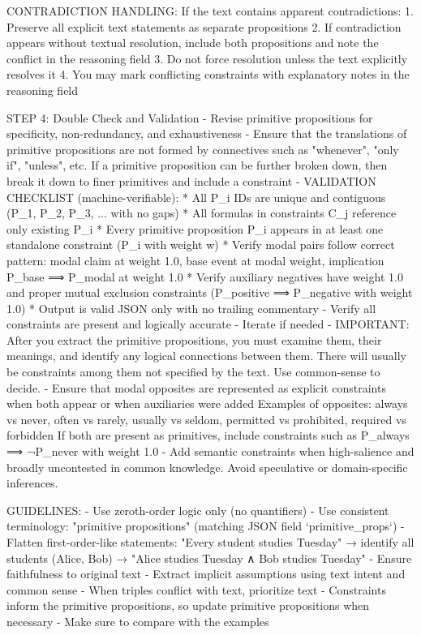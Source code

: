 CONTRADICTION HANDLING:
If the text contains apparent contradictions:
1. Preserve all explicit text statements as separate propositions
2. If contradiction appears without textual resolution, include both propositions and note the conflict in the reasoning field
3. Do not force resolution unless the text explicitly resolves it
4. You may mark conflicting constraints with explanatory notes in the reasoning field

STEP 4: Double Check and Validation
- Revise primitive propositions for specificity, non-redundancy, and exhaustiveness
- Ensure that the translations of primitive propositions are not formed by connectives such as "whenever", "only if", "unless", etc. If a primitive proposition can be further broken down, then break it down to finer primitives and include a constraint
- VALIDATION CHECKLIST (machine-verifiable):
  * All P_i IDs are unique and contiguous (P_1, P_2, P_3, ... with no gaps)
  * All formulas in constraints C_j reference only existing P_i
  * Every primitive proposition P_i appears in at least one standalone constraint (P_i with weight w)
  * Verify modal pairs follow correct pattern: modal claim at weight 1.0, base event at modal weight, implication P_base ⟹ P_modal at weight 1.0
  * Verify auxiliary negatives have weight 1.0 and proper mutual exclusion constraints (P_positive ⟹ P_negative with weight 1.0)
  * Output is valid JSON only with no trailing commentary
- Verify all constraints are present and logically accurate
- Iterate if needed
- IMPORTANT: After you extract the primitive propositions, you must examine them, their meanings, and identify any logical connections between them. There will usually be constraints among them not specified by the text. Use common-sense to decide.
- Ensure that modal opposites are represented as explicit constraints when both appear or when auxiliaries were added
  Examples of opposites: always vs never, often vs rarely, usually vs seldom, permitted vs prohibited, required vs forbidden
  If both are present as primitives, include constraints such as P_always ⟹ ¬P_never with weight 1.0
- Add semantic constraints when high-salience and broadly uncontested in common knowledge. Avoid speculative or domain-specific inferences.

GUIDELINES:
- Use zeroth-order logic only (no quantifiers)
- Use consistent terminology: "primitive propositions" (matching JSON field `primitive_props`)
- Flatten first-order-like statements: "Every student studies Tuesday" → identify all students (Alice, Bob) → "Alice studies Tuesday ∧ Bob studies Tuesday"
- Ensure faithfulness to original text
- Extract implicit assumptions using text intent and common sense
- When triples conflict with text, prioritize text
- Constraints inform the primitive propositions, so update primitive propositions when necessary
- Make sure to compare with the examples

